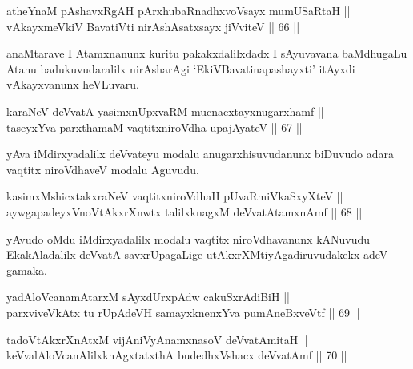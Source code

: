 
\begin{shl}
atheYnaM pAshavxRgAH pArxhubaRnadhxvoV\s sayx mumUSaRtaH || \\
vAkayxmeVkiV BavatiVti nirAshAsatxsayx jiVviteV \hfill || 66 ||  
\end{shl}

\begin{artha}
anaMtarave I Atamxnanunx kuritu pakakxdalilxdadx I sAyuvavana
baMdhugaLu Atanu badukuvudaralilx nirAsharAgi `EkiVBavatinapashayxti'
itAyxdi vAkayxvanunx heVLuvaru.
\end{artha}


\begin{shl}
karaNeV deVvatA yasimxnUpxvaRM mucnacxtayxnugarxhamf || \\
taseyxYva parxthamaM vaqtitxniroVdha upajAyateV \hfill || 67 ||  
\end{shl}

\begin{artha}
yAva iMdirxyadalilx deVvateyu modalu anugarxhisuvudanunx biDuvudo
adara vaqtitx niroVdhaveV modalu Aguvudu.
\end{artha}


\begin{shl}
kasimxMshicxtakxraNeV vaqtitxniroVdhaH pUvaRmiVkaSxyXteV || \\
aywgapadeyxVnoVtAkxrXnwtx talilxknagxM deVvatAtamxnAmf \hfill || 68 ||  
\end{shl}

\begin{artha}
yAvudo oMdu iMdirxyadalilx modalu vaqtitx niroVdhavanunx kANuvudu
EkakAladalilx deVvatA savxrUpagaLige utAkxrXMtiyAgadiruvudakekx adeV
gamaka.
\end{artha}

\begin{shl}
yadA\s \s loVcanamAtarxM sAyxdUrxpAdw cakuSxrAdiBiH || \\
parxviveVkAtx tu rUpAdeVH samayxknenxYva pumAneBxveVtf \hfill || 69 ||  
\end{shl}

\begin{shl}
tadoVtAkxrXnAtxM vijAniVyAnamxnasoV deVvatAmitaH || \\
keVvalAloVcanAlilxknAgxtatxthA budedhxVshacx deVvatAmf \hfill || 70 ||  
\end{shl}

